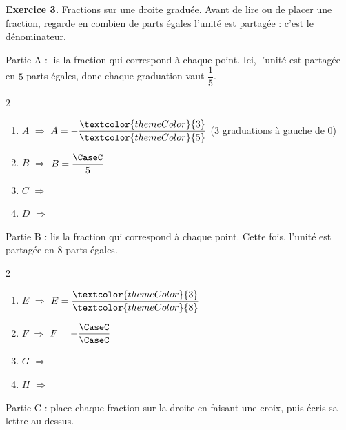 {\bfseries\color{themeColor}Exercice 3.} Fractions sur une droite graduée. Avant de lire ou de placer une fraction, regarde en combien de parts égales l'unité est partagée : c'est le dénominateur.

\medskip
\textcolor{themeColor}{Partie A} : lis la fraction qui correspond à chaque point. Ici, l'unité est partagée en $5$ parts égales, donc chaque graduation vaut $\dfrac{1}{5}$.

\begin{center}
\end{center}

\begin{multicols}{2}
\begin{enumerate}[leftmargin=*,align=parleft, label=\alph*), itemsep=9pt]
\item $A$ \quad $\Longrightarrow$ \quad $A=-\dfrac{\textcolor{themeColor}{3}}{\textcolor{themeColor}{5}}$ \quad ($3$ graduations à gauche de $0$)
\item $B$ \quad $\Longrightarrow$ \quad $B=\dfrac{\CaseC}{5}$
\item $C$ \quad $\Longrightarrow$
\item $D$ \quad $\Longrightarrow$
\end{enumerate}
\end{multicols}

\medskip
\textcolor{themeColor}{Partie B} : lis la fraction qui correspond à chaque point. Cette fois, l'unité est partagée en $8$ parts égales.

\begin{center}
\end{center}

\begin{multicols}{2}
\begin{enumerate}[leftmargin=*,align=parleft, label=\alph*), itemsep=9pt, start=5]
\item $E$ \quad $\Longrightarrow$ \quad $E=\dfrac{\textcolor{themeColor}{3}}{\textcolor{themeColor}{8}}$
\item $F$ \quad $\Longrightarrow$ \quad $F=-\dfrac{\CaseC}{\CaseC}$
\item $G$ \quad $\Longrightarrow$
\item $H$ \quad $\Longrightarrow$
\end{enumerate}
\end{multicols}

\newpage
\textcolor{themeColor}{Partie C} : place chaque fraction sur la droite en faisant une croix, puis écris sa lettre au-dessus.

